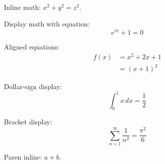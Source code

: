 

Inline math: $x^2 + y^2 = z^2$.

Display math with equation:
\begin{equation}
\label{eq:euler}
e^{i\pi} + 1 = 0
\end{equation}

Aligned equations:
\begin{align}
f(x) &= x^2 + 2x + 1 \\
     &= (x + 1)^2
\end{align}

Dollar-sign display: $$\int_0^1 x\, dx = \frac{1}{2}$$

Bracket display: \[ \sum_{n=1}^{\infty} \frac{1}{n^2} = \frac{\pi^2}{6} \]

Paren inline: \( a + b \).


